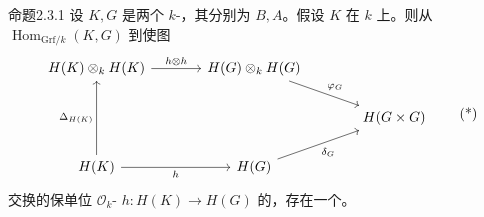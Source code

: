 \begin{SGAresult}{命题}{2.3.1}
设 $K,G$ 是两个 $k$-，其分别为 $B,A$。假设 $K$ 在 $k$ 上。则从 $\operatorname{Hom}_{\mathrm{Grf}/k}(K,G)$ 到使图
\[
\begin{tikzcd}[column sep=large]
H(K)\otimes_k H(K)\arrow[r,"h\otimes h"]&H(G)\otimes_k H(G)\arrow[dr,"\varphi_G"]&\\
&&H(G\times G)\\
H(K)\arrow[uu,"\Delta_{H(K)}"]\arrow[r,"h"']&H(G)\arrow[ur,"\delta_G"']&
\end{tikzcd}\tag{*}
\]
交换的保单位 $\mathscr O_k$- $h:H(K)\to H(G)$ 的，存在一个。
\end{SGAresult}
